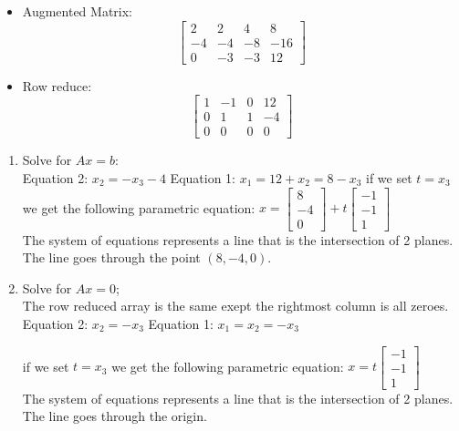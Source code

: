 \documentclass[12pt,a4paper]{exam}
\begin{document}
\begin{enumerate}
\begin{solution}
  \begin{itemize}
    \item Augmented Matrix:\\
      \[
        \left[\begin{array}{cccc} 2 & 2 & 4 & 8 \\ -4 & -4 & -8 & -16 \\ 0 & -3 & -3 & 12
        \end{array}\right]
      \]
    \item Row reduce:\\
      \[
        \left[\begin{array}{cccc} 1 & -1 & 0 & 12 \\ 0 & 1 & 1 & -4 \\ 0 & 0 & 0 & 0
        \end{array}\right]
      \]
  \end{itemize}
  \begin{enumerate}
    \item Solve for $Ax=b$:\\
      Equation 2: $x_2=-x_3-4$ 
      Equation 1: $x_1=12+x_2=8-x_3$
      if we set $t=x_3$ we get the following parametric equation: 
      $x=\left[\begin{array}{c} 8 \\ -4 \\ 0 \end{array}\right] + t\left[\begin{array}{c} -1 \\ -1 \\ 1 \end{array}\right]$\\
      The system of equations represents a line that is the intersection of 2 planes. The line goes through the point $(8,-4,0)$.
    \item Solve for $Ax=0$;\\
      The row reduced array is the same exept the rightmost column is all zeroes.\\
      Equation 2: $x_2=-x_3$ 
      Equation 1: $x_1=x_2=-x_3$


      if we set $t=x_3$ we get the following parametric equation: 
      $x=t\left[\begin{array}{c} -1 \\ -1 \\ 1 \end{array}\right]$\\
      The system of equations represents a line that is the intersection of 2 planes. The line goes through the origin.


\end{enumerate}
\end{solution}
\end{enumerate}
\end{document}
